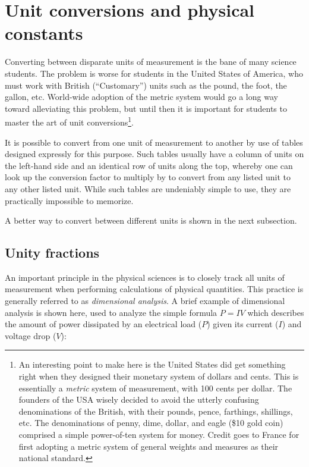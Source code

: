 \filbreak
\section{Unit conversions and physical constants}

\label{Unit conversions}

Converting between disparate units of measurement is the bane of many science students.  The problem is worse for students in the United States of America, who must work with British (``Customary'') units such as the pound, the foot, the gallon, etc.  World-wide adoption of the metric system would go a long way toward alleviating this problem, but until then it is important for students to master the art of unit conversions\footnote{An interesting point to make here is the United States did get something right when they designed their monetary system of dollars and cents.  This is essentially a \textit{metric} system of measurement, with 100 cents per dollar.  The founders of the USA wisely decided to avoid the utterly confusing denominations of the British, with their pounds, pence, farthings, shillings, etc.  The denominations of penny, dime, dollar, and eagle (\$10 gold coin) comprised a simple power-of-ten system for money.  Credit goes to France for first adopting a metric system of general weights and measures as their national standard.}.

It is possible to convert from one unit of measurement to another by use of tables designed expressly for this purpose.  Such tables usually have a column of units on the left-hand side and an identical row of units along the top, whereby one can look up the conversion factor to multiply by to convert from any listed unit to any other listed unit.  While such tables are undeniably simple to use, they are practically impossible to memorize.

A better way to convert between different units is shown in the next subsection.












\filbreak
\subsection{Unity fractions}

An important principle in the physical sciences is to closely track all units of measurement when performing calculations of physical quantities.  This practice is generally referred to as \textit{dimensional analysis}.  A brief example of dimensional analysis is shown here, used to analyze the simple formula $P = IV$ which describes the amount of power dissipated by an electrical load ($P$) given its current ($I$) and voltage drop ($V$):  

